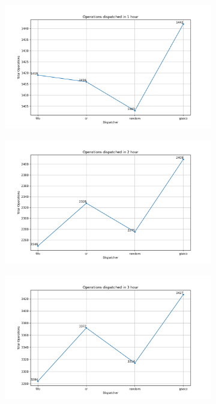 \begin{figure}[ht]
	\centering
	\begin{subfigure}{0.32\textwidth}
		\includegraphics[width=\textwidth]{LVHM/total_operations_3600s.png}
		\caption{}
		\label{fig:o1}
	\end{subfigure}\hfill
	\begin{subfigure}{0.32\textwidth}
		\includegraphics[width=\textwidth]{LVHM/total_operations_7200s.png}
		\caption{}
		\label{fig:o2}
	\end{subfigure}\hfill
	\begin{subfigure}{0.32\textwidth}
		\includegraphics[width=\textwidth]{LVHM/total_operations_10800s.png}

\end{subfigure}
\end{figure}
